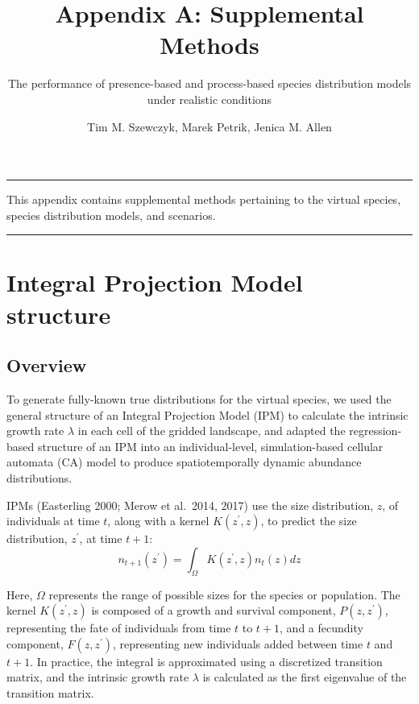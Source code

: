 \documentclass[]{article}
\title{Appendix A: Supplemental Methods}
\subtitle{The performance of presence-based and process-based species distribution
models under realistic conditions}
\author{Tim M. Szewczyk, Marek Petrik, Jenica M. Allen}
\date{}
\begin{document}
\maketitle

{
\setcounter{tocdepth}{1}
\tableofcontents
}
\setcounter{table}{0}  \renewcommand{\thetable}{A.\arabic{table}} \setcounter{figure}{0} \renewcommand{\thefigure}{A.\arabic{figure}}

\begin{center}\rule{0.5\linewidth}{\linethickness}\end{center}

This appendix contains supplemental methods pertaining to the virtual
species, species distribution models, and scenarios.

\begin{center}\rule{0.5\linewidth}{\linethickness}\end{center}

\section{Integral Projection Model structure}
\subsection{Overview}

To generate fully-known true distributions for the virtual species, we
used the general structure of an Integral Projection Model (IPM) to
calculate the intrinsic growth rate \(\lambda\) in each cell of the
gridded landscape, and adapted the regression-based structure of an IPM
into an individual-level, simulation-based cellular automata (CA) model
to produce spatiotemporally dynamic abundance distributions.

IPMs (Easterling 2000; Merow et al.~2014, 2017) use the size
distribution, \(z\), of individuals at time \(t\), along with a kernel
\(K(z^{\prime}, z)\), to predict the size distribution, \(z^{\prime}\),
at time \(t+1\): \begin{equation}
n_{t+1}(z^{\prime}) = \int_{\Omega} K(z^{\prime}, z) n_t(z) dz
\end{equation}

Here, \(\Omega\) represents the range of possible sizes for the species
or population. The kernel \(K(z^{\prime}, z)\) is composed of a growth
and survival component, \(P(z, z^{\prime})\), representing the fate of
individuals from time \(t\) to \(t+1\), and a fecundity component,
\(F(z, z^{\prime})\), representing new individuals added between time
\(t\) and \(t+1\). In practice, the integral is approximated using a
discretized transition matrix, and the intrinsic growth rate \(\lambda\)
is calculated as the first eigenvalue of the transition matrix.
\end{document}
